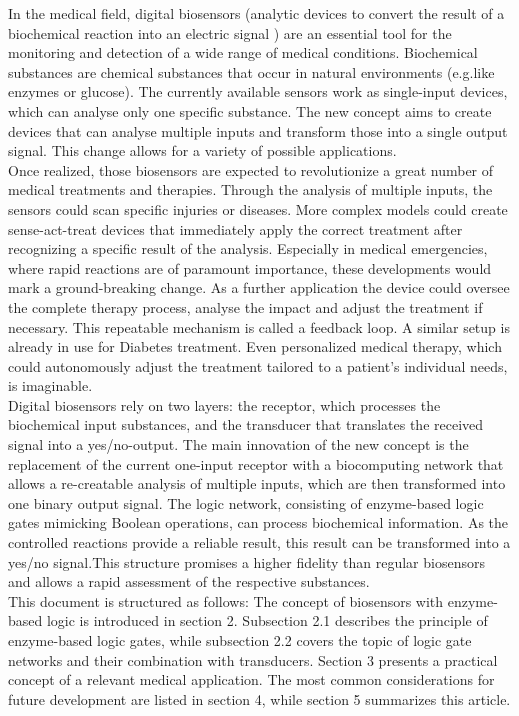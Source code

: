 \documentclass[runningheads]{llncs}
\begin{document}
	In the medical field, digital biosensors (analytic devices to convert the result of a biochemical reaction into an electric signal \cite{definitions}) are an essential tool for the monitoring and detection of a wide range of medical conditions. Biochemical substances are chemical substances that occur in natural environments (e.g.like enzymes or glucose). The currently available sensors work as single-input devices, which can analyse only one specific substance. The new concept aims to create devices that can analyse multiple inputs and transform those into a single output signal. This change allows for a variety of possible applications. \cite{original}\\
	\newline
	Once realized, those biosensors are expected to revolutionize a great number of medical treatments and therapies. Through the analysis of multiple inputs, the sensors could scan specific injuries or diseases. More complex models could create sense-act-treat devices that immediately apply the correct treatment after recognizing a specific result of the analysis. Especially in medical emergencies, where rapid reactions are of paramount importance, these developments would mark a ground-breaking change. As a further application the device could oversee the complete therapy process, analyse the impact and adjust the treatment if necessary. This repeatable mechanism is called a feedback loop. A similar setup is already in use for Diabetes treatment. Even personalized medical therapy, which could autonomously adjust the treatment tailored to a patient’s individual needs, is imaginable. \cite{original}\\
	\newline	
	Digital biosensors rely on two layers: the receptor, which processes the biochemical input substances, and the transducer that translates the received signal into a yes/no-output\cite{state of the art}. The main innovation of the new concept is the replacement of the current one-input receptor with a biocomputing network that allows a re-creatable analysis of multiple inputs, which are then transformed into one binary output signal. The logic network, consisting of enzyme-based logic gates mimicking Boolean operations, can process biochemical information\cite{haupt}. As the controlled reactions provide a reliable result, this result can be transformed into a yes/no signal.This structure promises a higher fidelity than regular biosensors and allows a rapid assessment of the respective substances. \\
	\newline
	This document is structured as follows: The concept of biosensors with enzyme-based logic is introduced in section 2. Subsection 2.1 describes the principle of enzyme-based logic gates, while subsection 2.2 covers the topic of logic gate networks and their combination with transducers. Section 3 presents a practical concept of a relevant medical application. The most common considerations for future development are listed in section 4, while section 5 summarizes this article.
	
\end{document}
